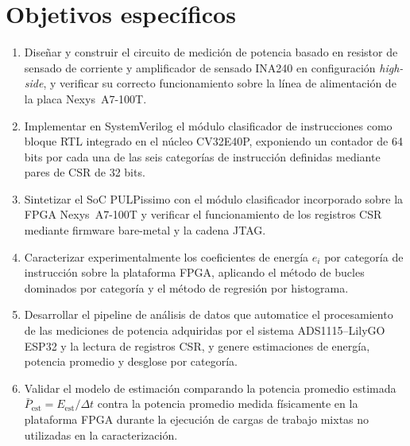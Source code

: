 \section{Objetivos específicos}
\label{sec:obj_especificos}

\begin{enumerate}

    \item Diseñar y construir el circuito de medición de potencia basado en
          resistor de sensado de corriente y amplificador de sensado INA240
          en configuración \emph{high-side}, y verificar su correcto
          funcionamiento sobre la línea de alimentación de la placa Nexys~A7-100T.

    \item Implementar en SystemVerilog el módulo clasificador de instrucciones
          como bloque RTL integrado en el núcleo CV32E40P, exponiendo un
          contador de 64 bits por cada una de las seis categorías de
          instrucción definidas mediante pares de CSR de 32 bits.

    \item Sintetizar el SoC PULPissimo con el módulo clasificador incorporado
          sobre la FPGA Nexys~A7-100T y verificar el funcionamiento de los
          registros CSR mediante firmware bare-metal y la cadena JTAG.

    \item Caracterizar experimentalmente los coeficientes de energía $e_i$
          por categoría de instrucción sobre la plataforma FPGA, aplicando
          el método de bucles dominados por categoría y el método de regresión
          por histograma.

    \item Desarrollar el pipeline de análisis de datos que automatice el
          procesamiento de las mediciones de potencia adquiridas por el sistema
          ADS1115--LilyGO ESP32 y la lectura de registros CSR, y genere
          estimaciones de energía, potencia promedio y desglose por categoría.

    \item Validar el modelo de estimación comparando la potencia promedio estimada
          $\bar{P}_{\text{est}} = E_{\text{est}}/\Delta t$ contra la potencia promedio medida
          físicamente en la plataforma FPGA durante la ejecución de cargas de
          trabajo mixtas no utilizadas en la caracterización.

\end{enumerate}

